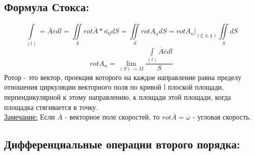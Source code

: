 \documentclass[12pt]{article}
\let\oldint\int
\let\oldiint\iint
\let\oldlim\lim
\renewcommand{\int}{\oldint\limits}
\renewcommand{\iint}{\oldiint\limits}
\renewcommand{\lim}{\oldlim\limits}
\begin{document}
  \subsection*{Формула Стокса:}
  \[\int_{(l)} = \overline{A}\overline{e}dl 
  = \iint_S \overline{rot}\overline{A}*\overline{n_0} dS 
  = \iint_S rot A_n dS
  = rot A_n \Big|_{(\xi,\eta,\chi)} \iint_S dS\]
  \[rot A_n = \lim_{(S) \to M} \frac{\int_{(l)} \overline{A}\overline{e}dl}{S}\]
  Ротор - это вектор, проекция которого на каждое направление равна пределу отношения циркуляции векторного
  поля по кривой l плоской площади, перпендикулярной к этому направлению, к площади этой площади, 
  когда площадка стягивается в точку.\\
  \underline{Замечание:} Если $\overline{A}$ - векторное поле скоростей, то 
  $\overline{rot}\overline{A} = \overline{\omega}$ - угловая скорость.
  \subsection*{Дифференциальные операции второго порядка:}
\end{document}
